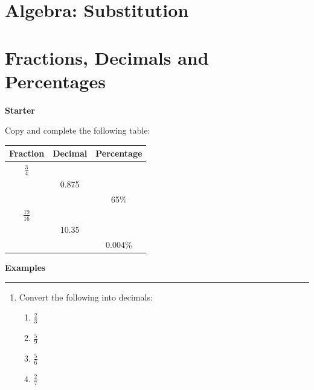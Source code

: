 \documentclass{article}
\begin{document}
\newpage

\section{Algebra: Substitution}

\newpage

\section{Fractions, Decimals and Percentages}

\newpage

\noindent \textbf{Starter}

\medskip

\hline

\medskip

\noindent Copy and complete the following table:

\begingroup
    
\renewcommand{\arraystretch}{1.5}
\setlength{\tabcolsep}{10pt}

\begin{table}[h!]
    \centering
    \begin{tabular}{|c|c|c|}
        \hline
         Fraction & Decimal & Percentage \\
         \hline
         \(\frac{3}{4}\) &  & \\
         & 0.875 & \\
         & & 65\% \\
         \(\frac{19}{16}\) & & \\
         & 10.35 & \\
         & & 0.004\% \\
         \hline
    \end{tabular}
    \label{tab:placeholder}
\end{table}

\endgroup

\newpage

\noindent \textbf{Examples}

\medskip

\hrule

\medskip

\begin{enumerate}
    \item Convert the following into decimals:
    \begin{enumerate}
        \item \(\frac{2}{3}\)
        \bigskip
        \item \(\frac{5}{9}\)
        \bigskip
        \item \(\frac{5}{6}\)
        \bigskip
        \item \(\frac{2}{7}\)
    \end{enumerate}
\end{enumerate}
\end{document}
